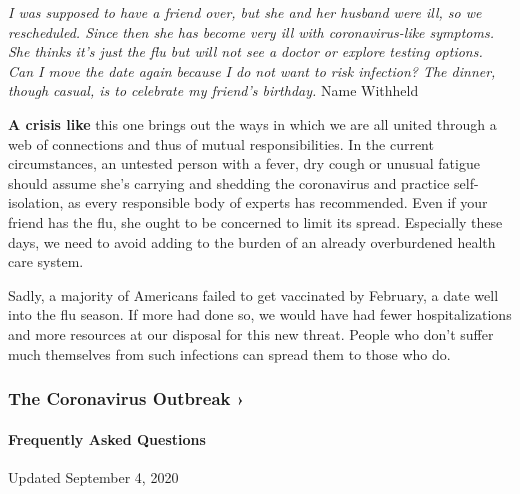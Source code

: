 \emph{I was supposed to have a friend over, but she and her husband were
ill, so we rescheduled. Since then she has become very ill with
coronavirus-like symptoms. She thinks it's just the flu but will not see
a doctor or explore testing options. Can I move the date again because I
do not want to risk infection? The dinner, though casual, is to
celebrate my friend's birthday.} Name Withheld

\textbf{A crisis like} this one brings out the ways in which we are all
united through a web of connections and thus of mutual responsibilities.
In the current circumstances, an untested person with a fever, dry cough
or unusual fatigue should assume she's carrying and shedding the
coronavirus and practice self-isolation, as every responsible body of
experts has recommended. Even if your friend has the flu, she ought to
be concerned to limit its spread. Especially these days, we need to
avoid adding to the burden of an already overburdened health care
system.

Sadly, a majority of Americans failed to get vaccinated by February, a
date well into the flu season. If more had done so, we would have had
fewer hospitalizations and more resources at our disposal for this new
threat. People who don't suffer much themselves from such infections can
spread them to those who do.

\href{https://www.nytimes3xbfgragh.onion/news-event/coronavirus?action=click\&pgtype=Article\&state=default\&region=MAIN_CONTENT_3\&context=storylines_faq}{}

\hypertarget{the-coronavirus-outbreak-}{%
\subsubsection{The Coronavirus Outbreak
›}\label{the-coronavirus-outbreak-}}

\hypertarget{frequently-asked-questions}{%
\paragraph{Frequently Asked
Questions}\label{frequently-asked-questions}}

Updated September 4, 2020

